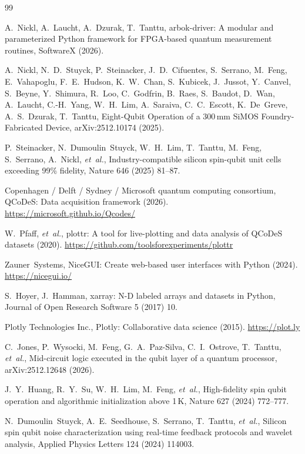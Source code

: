 \documentclass[preprint,12pt]{elsarticle}
\begin{document}

\begin{thebibliography}{99}

A.~Nickl, A.~Laucht, A.~Dzurak, T.~Tanttu,
arbok-driver: A modular and parameterized Python framework for FPGA-based quantum measurement routines,
SoftwareX (2026).

A.~Nickl, N.~D.~Stuyck, P.~Steinacker, J.~D.~Cifuentes, S.~Serrano, M.~Feng, E.~Vahapoglu, F.~E.~Hudson, K.~W.~Chan, S.~Kubicek, J.~Jussot, Y.~Canvel, S.~Beyne, Y.~Shimura, R.~Loo, C.~Godfrin, B.~Raes, S.~Baudot, D.~Wan, A.~Laucht, C.-H.~Yang, W.~H.~Lim, A.~Saraiva, C.~C.~Escott, K.~De~Greve, A.~S.~Dzurak, T.~Tanttu,
Eight-Qubit Operation of a 300\,mm SiMOS Foundry-Fabricated Device,
arXiv:2512.10174 (2025).

P.~Steinacker, N.~Dumoulin~Stuyck, W.~H.~Lim, T.~Tanttu, M.~Feng, S.~Serrano, A.~Nickl, \emph{et~al.},
Industry-compatible silicon spin-qubit unit cells exceeding 99\% fidelity,
Nature 646 (2025) 81--87.

Copenhagen / Delft / Sydney / Microsoft quantum computing consortium,
QCoDeS: Data acquisition framework (2026).
\url{https://microsoft.github.io/Qcodes/}

W.~Pfaff, \emph{et~al.},
plottr: A tool for live-plotting and data analysis of QCoDeS datasets (2020).
\url{https://github.com/toolsforexperiments/plottr}

Zauner~Systems,
NiceGUI: Create web-based user interfaces with Python (2024).
\url{https://nicegui.io/}

S.~Hoyer, J.~Hamman,
xarray: N-D labeled arrays and datasets in Python,
Journal of Open Research Software 5 (2017) 10.

Plotly Technologies Inc.,
Plotly: Collaborative data science (2015).
\url{https://plot.ly}

C.~Jones, P.~Wysocki, M.~Feng, G.~A.~Paz-Silva, C.~I.~Ostrove, T.~Tanttu, \emph{et~al.},
Mid-circuit logic executed in the qubit layer of a quantum processor,
arXiv:2512.12648 (2026).

J.~Y.~Huang, R.~Y.~Su, W.~H.~Lim, M.~Feng, \emph{et~al.},
High-fidelity spin qubit operation and algorithmic initialization above 1\,K,
Nature 627 (2024) 772--777.

N.~Dumoulin~Stuyck, A.~E.~Seedhouse, S.~Serrano, T.~Tanttu, \emph{et~al.},
Silicon spin qubit noise characterization using real-time feedback protocols and wavelet analysis,
Applied Physics Letters 124 (2024) 114003.

\end{thebibliography}
\end{document}

